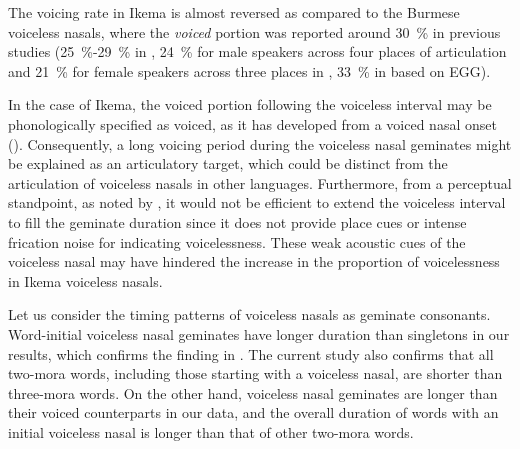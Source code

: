 \documentclass[output=paper]{langscibook}
\begin{document}
The voicing rate in Ikema is almost reversed as compared to the Burmese voiceless nasals, where the \textit{voiced} portion was reported around 30~\% in previous studies (25~\%-29~\% in \citealt{Dantsuji1984,Dantsuji1986}, 24~\% for male speakers across four places of articulation and 21~\% for female speakers across three places in \citealt{BhaskararaoLadefoged1991}, 33~\% in \citealt{ChirkovaEtAl2019} based on EGG).

In the case of Ikema, the voiced portion following the voiceless interval may be phonologically specified as voiced, as it has developed from a voiced nasal onset (). Consequently, a long voicing period during the voiceless nasal geminates might be explained as an articulatory target, which could be distinct from the articulation of voiceless nasals in other languages. Furthermore, from a perceptual standpoint, as noted by \citet{OhalaOhala1993}, it would not be efficient to extend the voiceless interval to fill the geminate duration since it does not provide place cues or intense frication noise for indicating voicelessness. These weak acoustic cues of the voiceless nasal may have hindered the increase in the proportion of voicelessness in Ikema voiceless nasals.

Let us consider the timing patterns of voiceless nasals as geminate consonants. Word-initial voiceless nasal geminates have longer duration than singletons in our results, which confirms the finding in \citet[264]{ShinoharaFujimoto2018}. The current study also confirms that all two-mora words, including those starting with a voiceless nasal, are shorter than three-mora words. On the other hand, voiceless nasal geminates are longer than their voiced counterparts in our data, and the overall duration of words with an initial voiceless nasal is longer than that of other two-mora words.
\end{document}
